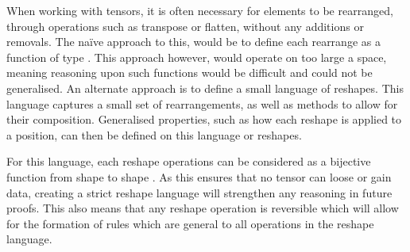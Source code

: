When working with tensors, it is often necessary for elements to be rearranged, 
through operations such as transpose or flatten, without any additions or removals.
The naïve approach to this, would be to define each rearrange as a function of type .
This approach however, would operate on too large a space, meaning reasoning upon
such functions would be difficult and could not be generalised.
An alternate approach is to define a small language of reshapes.
This language captures a small set of rearrangements, as well as methods to allow
for their composition.
Generalised properties, such as how each reshape is applied to a position, can 
then be defined on this language or reshapes.

For this language, each reshape operations can be considered as a bijective function
from shape  to shape . 
As this ensures that no tensor can loose or gain data, creating a strict reshape 
language will strengthen any reasoning in future proofs.
This also means that any reshape operation is reversible which will allow for the
formation of rules which are general to all operations in the reshape language.

